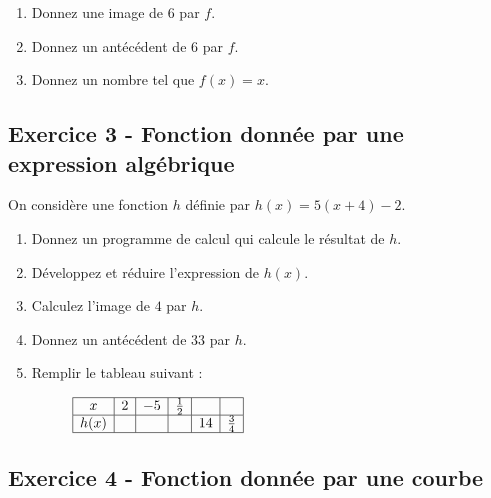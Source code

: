 \documentclass[14 pt, fleqn]{extarticle}
\theoremstyle{plain}
\begin{document}
\begin{enumerate}
\item Donnez une image de $6$ par $f$. 
\item Donnez un antécédent de $6$ par $f$. 
\item Donnez un nombre tel que $f(x)=x$.
\end{enumerate}


\subsection*{Exercice 3 - Fonction donnée par une expression algébrique}	 
	 
On considère une fonction $h$ définie par $h(x)= 5(x+4) -2$. 
\begin{enumerate}
\item Donnez un programme de calcul qui calcule le résultat de $h$. 
\item Développez et réduire l'expression de $h(x)$. 
\item Calculez l'image de $4$ par $h$. 
\item Donnez un antécédent de $33$ par $h$. 
\item Remplir le tableau suivant : 
	 
\begin{figure}[H]
\center
$\begin{array}{|c|c|c|c|c|c|}
\hline
 x &  2 & -5 & \frac12 &    &   \\
\hline
h(x)&   & & & 14 &   \frac34   \\
\hline
\end{array}$
\end{figure}
\end{enumerate} 

	 
\subsection*{Exercice 4 - Fonction donnée par une courbe}	 
	 
\end{document}
